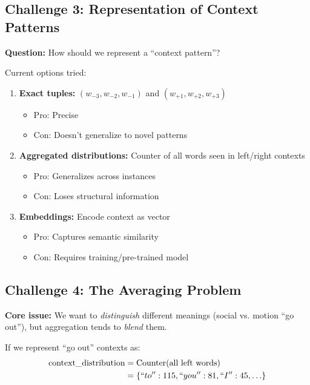 \documentclass[11pt]{article}
\begin{document}
\subsection{Challenge 3: Representation of Context Patterns}

\textbf{Question:} How should we represent a ``context pattern''?

Current options tried:
\begin{enumerate}
\item \textbf{Exact tuples:} $(w_{-3}, w_{-2}, w_{-1})$ and $(w_{+1}, w_{+2}, w_{+3})$
    \begin{itemize}
    \item Pro: Precise
    \item Con: Doesn't generalize to novel patterns
    \end{itemize}

\item \textbf{Aggregated distributions:} Counter of all words seen in left/right contexts
    \begin{itemize}
    \item Pro: Generalizes across instances
    \item Con: Loses structural information
    \end{itemize}

\item \textbf{Embeddings:} Encode context as vector
    \begin{itemize}
    \item Pro: Captures semantic similarity
    \item Con: Requires training/pre-trained model
    \end{itemize}
\end{enumerate}

\subsection{Challenge 4: The Averaging Problem}

\textbf{Core issue:} We want to \emph{distinguish} different meanings (social vs. motion ``go out''), but aggregation tends to \emph{blend} them.

If we represent ``go out'' contexts as:
\begin{align*}
\text{context\_distribution} &= \text{Counter}(\text{all left words}) \\
&= \{``to'': 115, ``you'': 81, ``I'': 45, \ldots\}
\end{align*}
\end{document}

